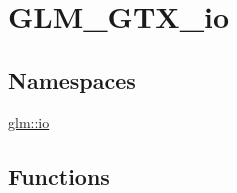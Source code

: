 \hypertarget{group__gtx__io}{}\section{G\+L\+M\+\_\+\+G\+T\+X\+\_\+io}
\label{group__gtx__io}
\subsection*{Namespaces}
\begin{DoxyCompactItemize}
\item 
 \mbox{\hyperlink{namespaceglm_1_1io}{glm\+::io}}
\end{DoxyCompactItemize}
\subsection*{Functions}
